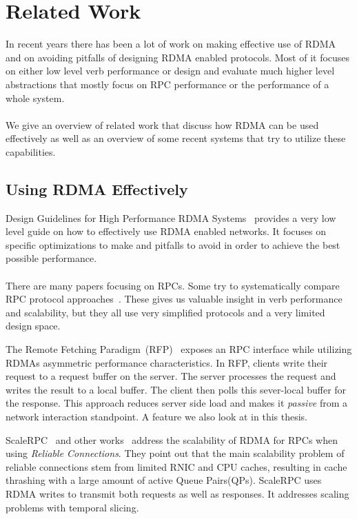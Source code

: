 \section{Related Work}

In recent years there has been a lot of work on making effective use of RDMA and on avoiding pitfalls of designing  
RDMA enabled protocols. Most of it focuses on either low level verb performance or design and evaluate much higher level
abstractions that mostly focus on RPC performance or the performance of a whole system.

\paragraph{} We give an overview of related work that discuss how  RDMA can be used effectively as well as an overview of 
some recent systems that try to utilize these capabilities.

\subsection{Using RDMA Effectively}

Design Guidelines for High Performance RDMA Systems~\cite{anuj-guide} provides a very low level guide on how to
effectively use RDMA enabled networks. It focuses on specific optimizations to make and pitfalls to avoid in order to 
achieve the best possible performance. 

\paragraph{} There are many papers focusing on RPCs. Some try to systematically compare RPC protocol
approaches~\cite{ziegler2020rdma,Huang2019AnEO}.  These gives us valuable insight in verb performance and scalability, but 
they all use very simplified protocols and a very limited design space.

The Remote Fetching Paradigm~(RFP)~\cite{rfp} exposes an RPC interface while utilizing RDMAs asymmetric performance 
characteristics. In RFP, clients write their request to a request buffer on the server. The server processes the request
and writes the result to a local buffer. The client then polls this sever-local buffer for the response. This approach reduces 
server side load and makes it \emph{passive} from a network interaction standpoint. A feature we also look at in this thesis.

ScaleRPC~\cite{scal-rdma-rpc} and other works~\cite{fasst, rfp, herd} address the scalability of RDMA for RPCs when using 
\emph{Reliable Connections}. They point out that the main scalability problem of reliable connections stem from limited 
RNIC and CPU caches, resulting in cache thrashing with a large amount of active Queue Pairs(QPs). ScaleRPC uses RDMA writes to 
transmit both requests as well as responses. It addresses scaling problems with temporal slicing.



